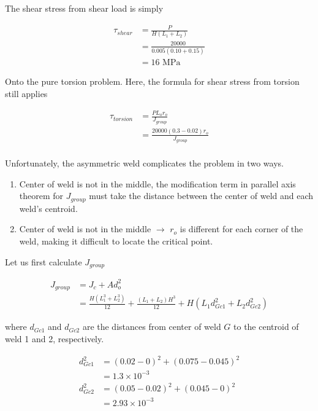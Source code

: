 \documentclass[a4paper,openany,12pt]{book}
\begin{document}
{{The shear stress from shear load is simply

$$\begin{aligned}
    \tau_{shear} &= \frac{P}{H(L_1 + L_2)} \\
                 &= \frac{20000}{0.005(0.10 + 0.15)} \\
                 &= 16 \text{ MPa}
  \end{aligned}$$

Onto the pure torsion problem. Here, the formula for shear stress from
torsion still applies

$$\begin{aligned}
    \tau_{torsion} &= \frac{P L_o r_o}{J_{group}} \\
                   &= \frac{20000(0.3 - 0.02)r_o}{J_{group}} \\
  \end{aligned}$$

Unfortunately, the asymmetric weld complicates the problem in two ways.

\begin{enumerate}
\item Center of weld is not in the middle, the modification term in
parallel axis theorem for \(J_{group}\) must take the distance between
the center of weld and each weld's centroid.

\item Center of weld is not in the middle \(\rightarrow\) \(r_o\) is different
for each corner of the weld, making it difficult to locate the
critical point.
\end{enumerate}

Let us first calculate \(J_{group}\)

$$\begin{aligned}
    J_{group} &= J_c + A d_o^2 \\
              &= \frac{H(L_1^3 + L_2^3)}{12} +\frac{(L_1 + L_2)H^3}{12} + H(L_1d_{Gc1}^2 + L_2d_{Gc2}^2)
  \end{aligned}$$

where \(d_{Gc1}\) and \(d_{Gc2}\) are the distances from center of weld \(G\)
to the centroid of weld 1 and 2, respectively.

$$\begin{aligned}
    d_{Gc1}^2 &= (0.02-0)^2+(0.075-0.045)^2 \\
              &= 1.3 \times 10^{-3} \\
    d_{Gc2}^2 &= (0.05-0.02)^2 + (0.045 - 0)^2 \\
              &= 2.93 \times 10^{-3}
  \end{aligned}$$

}}
\end{document}
